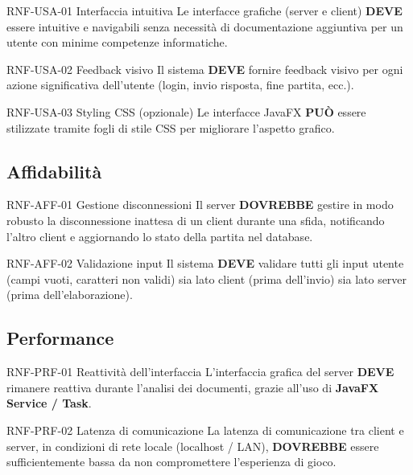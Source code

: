 \documentclass[12pt, a4paper]{article}
\newcommand{\mustshall}{\textbf{DEVE}}
\newcommand{\should}{\textbf{DOVREBBE}}
\newcommand{\may}{\textbf{PUÒ}}
\begin{document}
\begin{reqbox}{RNF-USA-01 \quad Interfaccia intuitiva \quad [MUST]}
Le interfacce grafiche (server e client) \mustshall{} essere intuitive e navigabili senza necessità di documentazione aggiuntiva per un utente con minime competenze informatiche.
\end{reqbox}

\begin{reqbox}{RNF-USA-02 \quad Feedback visivo \quad [MUST]}
Il sistema \mustshall{} fornire feedback visivo per ogni azione significativa dell'utente (login, invio risposta, fine partita, ecc.).
\end{reqbox}

\begin{reqbox}{RNF-USA-03 \quad Styling CSS (opzionale) \quad [MAY]}
Le interfacce JavaFX \may{} essere stilizzate tramite fogli di stile CSS per migliorare l'aspetto grafico.
\end{reqbox}

\subsection{Affidabilità}

\begin{reqbox}{RNF-AFF-01 \quad Gestione disconnessioni \quad [SHOULD]}
Il server \should{} gestire in modo robusto la disconnessione inattesa di un client durante una sfida, notificando l'altro client e aggiornando lo stato della partita nel database.
\end{reqbox}

\begin{reqbox}{RNF-AFF-02 \quad Validazione input \quad [MUST]}
Il sistema \mustshall{} validare tutti gli input utente (campi vuoti, caratteri non validi) sia lato client (prima dell'invio) sia lato server (prima dell'elaborazione).
\end{reqbox}

\subsection{Performance}

\begin{reqbox}{RNF-PRF-01 \quad Reattività dell'interfaccia \quad [MUST]}
L'interfaccia grafica del server \mustshall{} rimanere reattiva durante l'analisi dei documenti, grazie all'uso di \textbf{JavaFX Service / Task}.
\end{reqbox}

\begin{reqbox}{RNF-PRF-02 \quad Latenza di comunicazione \quad [SHOULD]}
La latenza di comunicazione tra client e server, in condizioni di rete locale (localhost / LAN), \should{} essere sufficientemente bassa da non compromettere l'esperienza di gioco.
\end{reqbox}
\end{document}
